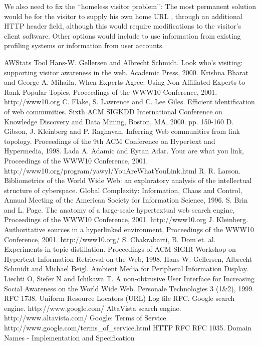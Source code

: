 \documentclass[a4paper,twoside]{danarticle}
\theoremstyle{remark}
\begin{document}
    We also need
    to fix the \lq\lq homeless visitor problem\rq\rq : The most permanent
    solution would be for the visitor to supply his own home URL \cite{webaware},
    through an additional HTTP header field, although this would require
    modifications to the visitor's client software. Other options would include
    to use information from existing profiling systems or
    information from user accounts.
  \newpage    
  \begin{thebibliography}{99}
     AWStats Tool
     Hans-W. Gellersen and Albrecht Schmidt.
    Look who's visiting: supporting visitor awareness in the web.
    Academic Press, 2000.
     Krishna Bharat and George A. Mihaila.
     When Experts Agree: Using Non-Affiliated Experts to Rank Popular Topics,
     Proceedings of the WWW10 Conference, 2001.
     http://www10.org
     C. Flake, S. Lawrence and C. Lee Giles.
    Efficient identification of web communities.
    Sixth ACM SIGKDD International Conference on Knowledge Discovery and Data 
    Mining, Boston, MA, 2000. 
    pp. 150-160
     D. Gibson, J. Kleinberg and P. Raghavan.
    Inferring Web communities from link topology.
    Proceedings of the 9th ACM Conference on Hypertext and Hypermedia, 1998.
     Lada A. Adamic and Eytan Adar.
    Your are what you link, Proceedings of the WWW10 Conference, 2001.
    http://www10.org/program/yawyl/YouAreWhatYouLink.html
     R. R. Larson.
    Bibliometrics of the World Wide Web: an exploratory analysis of the
    intellectual structure of cyberspace.
    Global Complexity: Information, Chaos and Control, Annual Meeting of the
    American Society for Information Science, 1996.
     S. Brin and L. Page.
    The anatomy of a large-scale hypertextual web search engine, 
    Proceedings of the WWW10 Conference, 2001.
    http://www10.org
     J. Kleinberg.
    Authoritative sources in a hyperlinked environment, Proceedings of the WWW10
    Conference, 2001.
    http://www10.org/
     S. Chakrabarti, B. Dom et. al.
    Experiments in topic distillation.
    Proceedings of ACM SIGIR Workshop on Hypertext Information Retrieval on
    the Web, 1998.
     Hans-W. Gellersen, Albrecht Schmidt and Michael Beigl.
    Ambient Media for Peripheral Information Display.
     Liechti O, Siefer N and Ichikawa T.
    A non-obtrusive User Interface for Increasing Social Awareness on the 
    World Wide Web. Personale Technologies 3 (1\&2), 1999.
     RFC 1738. Uniform Resource Locators (URL) 
     Log file RFC.
     Google search engine. http://www.google.com/
     AltaVista search engine. http://www.altavista.com/
     Google: Terms of Service.
    http://www.google.com/terms\_of\_service.html
     HTTP RFC
     RFC 1035. Domain Names - Implementation and Specification
  \end{thebibliography}
\end{document}
